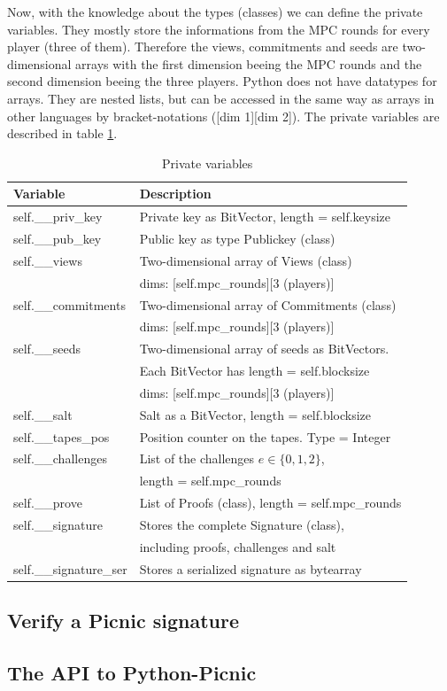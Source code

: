 \documentclass[]{article}
\begin{document}
\noindent Now, with the knowledge about the types (classes) we can define the private variables. They mostly store the informations from the MPC rounds for every player (three of them). Therefore the views, commitments and seeds are two-dimensional arrays with the first dimension beeing the MPC rounds and the second dimension beeing the three players. Python does not have datatypes for arrays. They are nested lists, but can be accessed in the same way as arrays in other languages by bracket-notations ([dim 1][dim 2]). The private variables are described in table \ref{tab:privvars}.
\begin{table}[htbp]
\begin{center}
\begin{tabular}{|l|l|}
\hline
\textbf{Variable}  & \textbf{Description} \\ \hline
self.\_\_priv\_key    & Private key as BitVector, length = self.keysize\\ \hline
self.\_\_pub\_key     & Public key as type Publickey (class)\\ \hline  
self.\_\_views        & Two-dimensional array of Views (class)\\
			          & dims: [self.mpc\_rounds][3 (players)]\\ \hline
self.\_\_commitments  & Two-dimensional array of Commitments (class)\\
					  & dims: [self.mpc\_rounds][3 (players)] \\ \hline
self.\_\_seeds 		  & Two-dimensional array of seeds as BitVectors.\\
			          & Each BitVector has length = self.blocksize\\ 
			          & dims: [self.mpc\_rounds][3 (players)] \\ \hline
self.\_\_salt  		  & Salt as a BitVector, length = self.blocksize\\ \hline
self.\_\_tapes\_pos  & Position counter on the tapes. Type = Integer\\ \hline
self.\_\_challenges  & List of the challenges $e \in \{0,1,2\}$,\\
					  & length = self.mpc\_rounds \\ \hline
self.\_\_prove       & List of Proofs (class), length = self.mpc\_rounds\\ \hline
self.\_\_signature   & Stores the complete Signature (class),\\
					  & including proofs, challenges and salt \\ \hline
self.\_\_signature\_ser & Stores a serialized signature as bytearray\\ \hline
\end{tabular}
\caption{Private variables}
\label{tab:privvars}
\end{center}
\end{table}
\subsection{Verify a Picnic signature}
\subsection{The API to Python-Picnic}
%
%
\end{document}
